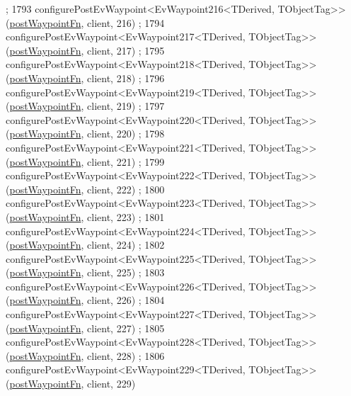 \begin{DoxyCode}
      ;
1793     configurePostEvWaypoint<EvWaypoint216<TDerived, TObjectTag>>(\hyperlink{classsmacc_1_1WaypointEventDispatcher_a6bccf6a93a827634b7b5e67ac0e4ec57}{postWaypointFn}, client, 216)
      ;
1794     configurePostEvWaypoint<EvWaypoint217<TDerived, TObjectTag>>(\hyperlink{classsmacc_1_1WaypointEventDispatcher_a6bccf6a93a827634b7b5e67ac0e4ec57}{postWaypointFn}, client, 217)
      ;
1795     configurePostEvWaypoint<EvWaypoint218<TDerived, TObjectTag>>(\hyperlink{classsmacc_1_1WaypointEventDispatcher_a6bccf6a93a827634b7b5e67ac0e4ec57}{postWaypointFn}, client, 218)
      ;
1796     configurePostEvWaypoint<EvWaypoint219<TDerived, TObjectTag>>(\hyperlink{classsmacc_1_1WaypointEventDispatcher_a6bccf6a93a827634b7b5e67ac0e4ec57}{postWaypointFn}, client, 219)
      ;
1797     configurePostEvWaypoint<EvWaypoint220<TDerived, TObjectTag>>(\hyperlink{classsmacc_1_1WaypointEventDispatcher_a6bccf6a93a827634b7b5e67ac0e4ec57}{postWaypointFn}, client, 220)
      ;
1798     configurePostEvWaypoint<EvWaypoint221<TDerived, TObjectTag>>(\hyperlink{classsmacc_1_1WaypointEventDispatcher_a6bccf6a93a827634b7b5e67ac0e4ec57}{postWaypointFn}, client, 221)
      ;
1799     configurePostEvWaypoint<EvWaypoint222<TDerived, TObjectTag>>(\hyperlink{classsmacc_1_1WaypointEventDispatcher_a6bccf6a93a827634b7b5e67ac0e4ec57}{postWaypointFn}, client, 222)
      ;
1800     configurePostEvWaypoint<EvWaypoint223<TDerived, TObjectTag>>(\hyperlink{classsmacc_1_1WaypointEventDispatcher_a6bccf6a93a827634b7b5e67ac0e4ec57}{postWaypointFn}, client, 223)
      ;
1801     configurePostEvWaypoint<EvWaypoint224<TDerived, TObjectTag>>(\hyperlink{classsmacc_1_1WaypointEventDispatcher_a6bccf6a93a827634b7b5e67ac0e4ec57}{postWaypointFn}, client, 224)
      ;
1802     configurePostEvWaypoint<EvWaypoint225<TDerived, TObjectTag>>(\hyperlink{classsmacc_1_1WaypointEventDispatcher_a6bccf6a93a827634b7b5e67ac0e4ec57}{postWaypointFn}, client, 225)
      ;
1803     configurePostEvWaypoint<EvWaypoint226<TDerived, TObjectTag>>(\hyperlink{classsmacc_1_1WaypointEventDispatcher_a6bccf6a93a827634b7b5e67ac0e4ec57}{postWaypointFn}, client, 226)
      ;
1804     configurePostEvWaypoint<EvWaypoint227<TDerived, TObjectTag>>(\hyperlink{classsmacc_1_1WaypointEventDispatcher_a6bccf6a93a827634b7b5e67ac0e4ec57}{postWaypointFn}, client, 227)
      ;
1805     configurePostEvWaypoint<EvWaypoint228<TDerived, TObjectTag>>(\hyperlink{classsmacc_1_1WaypointEventDispatcher_a6bccf6a93a827634b7b5e67ac0e4ec57}{postWaypointFn}, client, 228)
      ;
1806     configurePostEvWaypoint<EvWaypoint229<TDerived, TObjectTag>>(\hyperlink{classsmacc_1_1WaypointEventDispatcher_a6bccf6a93a827634b7b5e67ac0e4ec57}{postWaypointFn}, client, 229)

\end{DoxyCode}
